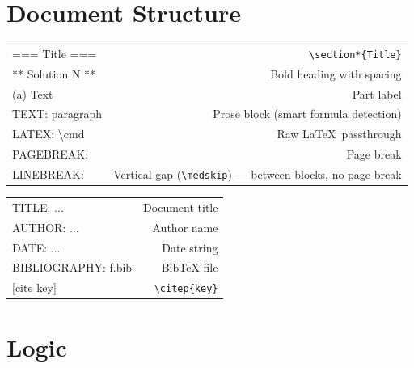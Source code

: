 
\section{Document Structure}

\begin{tabularx}{\columnwidth}{LR}
=== Title ===        & \verb|\section*{Title}| \\
** Solution N **     & Bold heading with spacing \\
(a) Text             & Part label \\
TEXT: paragraph       & Prose block (smart formula detection) \\
LATEX: \textbackslash cmd & Raw \LaTeX\ passthrough \\
PAGEBREAK:           & Page break \\
LINEBREAK:           & Vertical gap (\verb|\medskip|) — between blocks, no page break \\
\end{tabularx}

\smallskip
\begin{tabularx}{\columnwidth}{LR}
TITLE: ...           & Document title \\
AUTHOR: ...          & Author name \\
DATE: ...            & Date string \\
BIBLIOGRAPHY: f.bib  & BibTeX file \\
{[cite key]}         & \verb|\citep{key}| \\
\end{tabularx}

\section{Logic}

